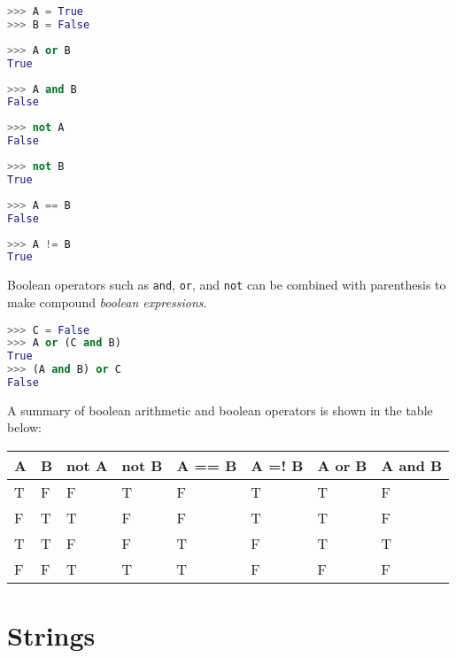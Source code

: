 \documentclass{book}
\newcommand{\passthrough}[1]{#1}
\begin{document}
\begin{lstlisting}[language=Python]
>>> A = True
>>> B = False
\end{lstlisting}

\begin{lstlisting}[language=Python]
>>> A or B
True
\end{lstlisting}

\begin{lstlisting}[language=Python]
>>> A and B
False
\end{lstlisting}

\begin{lstlisting}[language=Python]
>>> not A
False
\end{lstlisting}

\begin{lstlisting}[language=Python]
>>> not B
True
\end{lstlisting}

\begin{lstlisting}[language=Python]
>>> A == B
False
\end{lstlisting}

\begin{lstlisting}[language=Python]
>>> A != B
True
\end{lstlisting}

Boolean operators such as \passthrough{\lstinline!and!},
\passthrough{\lstinline!or!}, and \passthrough{\lstinline!not!} can be
combined with parenthesis to make compound \emph{boolean expressions}.

\begin{lstlisting}[language=Python]
>>> C = False
>>> A or (C and B)
True
>>> (A and B) or C
False
\end{lstlisting}
    




    
        A summary of boolean arithmetic and boolean operators is shown in the
table below:

\begin{longtable}[]{@{}llllllll@{}}
\toprule
A & B & not A & not B & A == B & A =! B & A or B & A and
B\tabularnewline
\midrule
\endhead
T & F & F & T & F & T & T & F\tabularnewline
F & T & T & F & F & T & T & F\tabularnewline
T & T & F & F & T & F & T & T\tabularnewline
F & F & T & T & T & F & F & F\tabularnewline
\bottomrule
\end{longtable}
    




    
        \hypertarget{strings}{%
\section{Strings}\label{strings}}
    
\end{document}
